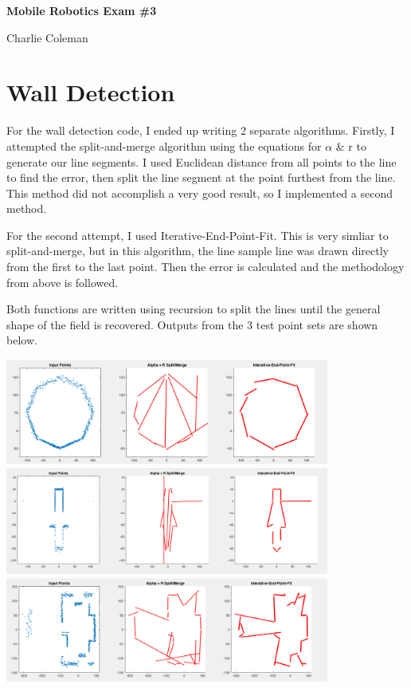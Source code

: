 \documentclass[12pt]{article}
\begin{document}
	\begin{center}
		\begin{Large} \textbf{Mobile Robotics Exam \#3} \end{Large}
	\end{center}

	\hfill Charlie Coleman
	
	\section{Wall Detection}

	For the wall detection code, I ended up writing 2 separate algorithms. Firstly, I attempted the split-and-merge algorithm using the equations for $\alpha$ \& r to generate our line segments. I used Euclidean distance from all points to the line to find the error, then split the line segment at the point furthest from the line. This method did not accomplish a very good result, so I implemented a second method.
	
	For the second attempt, I used Iterative-End-Point-Fit. This is very simliar to split-and-merge, but in this algorithm, the line sample line was drawn directly from the first to the last point. Then the error is calculated and the methodology from above is followed.
	
	Both functions are written using recursion to split the lines until the general shape of the field is recovered. Outputs from the 3 test point sets are shown below.
	
	\begin{center}
		\includegraphics[width=0.8\textwidth]{p1ex1}
		\includegraphics[width=0.8\textwidth]{p1ex2}
		\includegraphics[width=0.8\textwidth]{p1ex3}
	\end{center}
	
\end{document}
